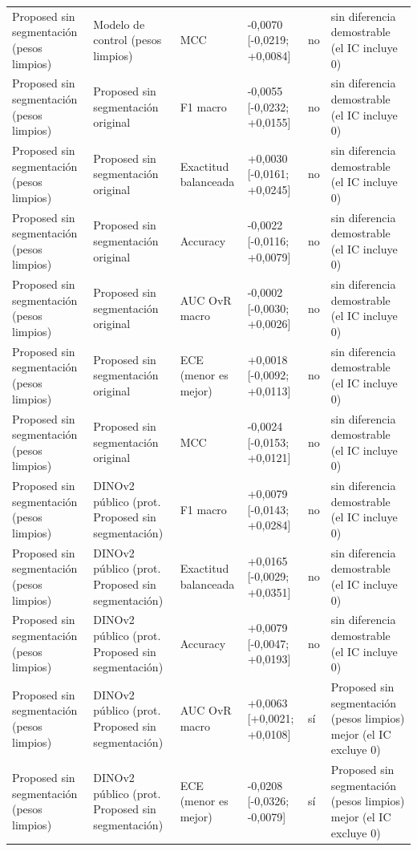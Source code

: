 \begin{longtable}{@{}llllll@{}}
Proposed sin segmentación (pesos limpios) & Modelo de control (pesos limpios) & MCC & -0,0070 [-0,0219; +0,0084] & no & sin diferencia demostrable (el IC incluye 0) \\
Proposed sin segmentación (pesos limpios) & Proposed sin segmentación original & F1 macro & -0,0055 [-0,0232; +0,0155] & no & sin diferencia demostrable (el IC incluye 0) \\
Proposed sin segmentación (pesos limpios) & Proposed sin segmentación original & Exactitud balanceada & +0,0030 [-0,0161; +0,0245] & no & sin diferencia demostrable (el IC incluye 0) \\
Proposed sin segmentación (pesos limpios) & Proposed sin segmentación original & Accuracy & -0,0022 [-0,0116; +0,0079] & no & sin diferencia demostrable (el IC incluye 0) \\
Proposed sin segmentación (pesos limpios) & Proposed sin segmentación original & AUC OvR macro & -0,0002 [-0,0030; +0,0026] & no & sin diferencia demostrable (el IC incluye 0) \\
Proposed sin segmentación (pesos limpios) & Proposed sin segmentación original & ECE (menor es mejor) & +0,0018 [-0,0092; +0,0113] & no & sin diferencia demostrable (el IC incluye 0) \\
Proposed sin segmentación (pesos limpios) & Proposed sin segmentación original & MCC & -0,0024 [-0,0153; +0,0121] & no & sin diferencia demostrable (el IC incluye 0) \\
Proposed sin segmentación (pesos limpios) & DINOv2 público (prot. Proposed sin segmentación) & F1 macro & +0,0079 [-0,0143; +0,0284] & no & sin diferencia demostrable (el IC incluye 0) \\
Proposed sin segmentación (pesos limpios) & DINOv2 público (prot. Proposed sin segmentación) & Exactitud balanceada & +0,0165 [-0,0029; +0,0351] & no & sin diferencia demostrable (el IC incluye 0) \\
Proposed sin segmentación (pesos limpios) & DINOv2 público (prot. Proposed sin segmentación) & Accuracy & +0,0079 [-0,0047; +0,0193] & no & sin diferencia demostrable (el IC incluye 0) \\
Proposed sin segmentación (pesos limpios) & DINOv2 público (prot. Proposed sin segmentación) & AUC OvR macro & +0,0063 [+0,0021; +0,0108] & sí & Proposed sin segmentación (pesos limpios) mejor (el IC excluye 0) \\
Proposed sin segmentación (pesos limpios) & DINOv2 público (prot. Proposed sin segmentación) & ECE (menor es mejor) & -0,0208 [-0,0326; -0,0079] & sí & Proposed sin segmentación (pesos limpios) mejor (el IC excluye 0) \\

\end{longtable}
